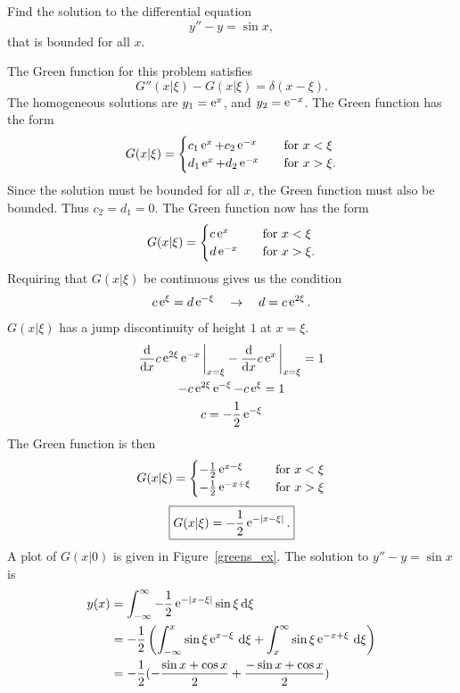 \begin{Example} \label{greens_sinx}
  Find the solution to the differential equation
  \[ 
  y'' - y = \sin x, 
  \]
  that is bounded for all $x$.

  The Green function for this problem satisfies
  \[
  G''(x|\xi) - G(x|\xi) = \delta(x-\xi).
  \]
  The homogeneous solutions are $y_1 = \mathop{\mathrm{e}}\nolimits^x$, and $y_2 = \mathop{\mathrm{e}}\nolimits^{-x}$.
  The Green function has the form
  \[ 
  G(x|\xi) = 
  \begin{cases}
    c_1 \mathop{\mathrm{e}}\nolimits^x + c_2 \mathop{\mathrm{e}}\nolimits^{-x} \quad &\mathrm{for}\ x < \xi \\
    d_1 \mathop{\mathrm{e}}\nolimits^x + d_2 \mathop{\mathrm{e}}\nolimits^{-x} \quad &\mathrm{for}\ x > \xi. 
  \end{cases}
  \]
  Since the solution must be bounded for all $x$, the Green function must
  also be bounded.  Thus $c_2 = d_1 = 0$.  
  The Green function now has the form
  \[ 
  G(x|\xi) = 
  \begin{cases}
    c \mathop{\mathrm{e}}\nolimits^x \quad &\mathrm{for}\ x < \xi \\
    d \mathop{\mathrm{e}}\nolimits^{-x} \quad &\mathrm{for}\ x > \xi. 
  \end{cases}
  \]
  Requiring that $G(x|\xi)$ be continuous gives us the condition
  \[ 
  c \mathop{\mathrm{e}}\nolimits^\xi = d \mathop{\mathrm{e}}\nolimits^{-\xi} \quad \to \quad d = c \mathop{\mathrm{e}}\nolimits^{2\xi}.
  \]
  $G(x|\xi)$ has a jump discontinuity of height $1$ at $x = \xi$.
  \begin{gather*}
    \frac{\mathrm{d}}{\mathrm{d} x}c \mathop{\mathrm{e}}\nolimits^{2\xi} \mathop{\mathrm{e}}\nolimits^{-x}\bigg|_{x=\xi} 
    - \frac{\mathrm{d}}{\mathrm{d} x} c \mathop{\mathrm{e}}\nolimits^x\bigg|_{x=\xi} = 1 \\
    -c \mathop{\mathrm{e}}\nolimits^{2\xi} \mathop{\mathrm{e}}\nolimits^{-\xi} - c \mathop{\mathrm{e}}\nolimits^\xi = 1 \\
    c = -\frac{1}{2} \mathop{\mathrm{e}}\nolimits^{-\xi}
  \end{gather*}
  The Green function is then
  \[ 
  G(x|\xi) = 
  \begin{cases}
    -\frac{1}{2} \mathop{\mathrm{e}}\nolimits^{x-\xi} \quad &\mathrm{for}\ x < \xi \\
    -\frac{1}{2} \mathop{\mathrm{e}}\nolimits^{-x+\xi} \quad &\mathrm{for}\ x > \xi 
  \end{cases} 
  \]
  \[ 
  \boxed{ 
    G(x|\xi) = -\frac{1}{2} \mathop{\mathrm{e}}\nolimits^{-|x-\xi|}. 
    } 
  \]
  A plot of $G(x|0)$ is given in Figure~\ref{greens_ex}. 
  The solution to $y'' - y = \sin x$ is
  \begin{align*}
    y(x) &= \int_{-\infty}^\infty -\frac{1}{2} \e^{-|x-\xi|} \sin\xi\,\dd \xi \\
    &= -\frac{1}{2} \left( \int_{-\infty}^x \sin\xi \e^{x-\xi}\,\dd \xi + 
      \int_x^\infty \sin\xi \e^{-x+\xi}\,\dd \xi \right) \\
    &= -\frac{1}{2} (-\frac{\sin x+\cos x}{2} +\frac{-\sin x+\cos x}{2})

\end{align*}
\end{Example}
